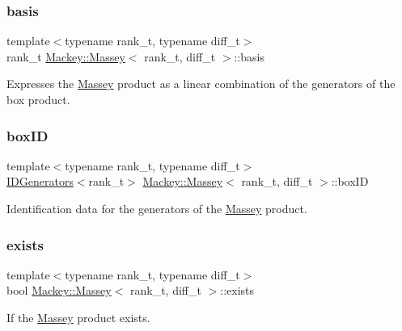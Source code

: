\subsubsection{\texorpdfstring{basis}{basis}}
{\footnotesize\ttfamily template$<$typename rank\+\_\+t, typename diff\+\_\+t$>$ \\
rank\+\_\+t \hyperlink{classMackey_1_1Massey}{Mackey\+::\+Massey}$<$ rank\+\_\+t, diff\+\_\+t $>$\+::basis}



Expresses the \hyperlink{classMackey_1_1Massey}{Massey} product as a linear combination of the generators of the box product. 

\mbox{\label{classMackey_1_1Massey_ae105b04a17ced9c6fd8fef94a9b56aa2}} 
\subsubsection{\texorpdfstring{box\+ID}{boxID}}
{\footnotesize\ttfamily template$<$typename rank\+\_\+t, typename diff\+\_\+t$>$ \\
\hyperlink{classMackey_1_1IDGenerators}{I\+D\+Generators}$<$rank\+\_\+t$>$ \hyperlink{classMackey_1_1Massey}{Mackey\+::\+Massey}$<$ rank\+\_\+t, diff\+\_\+t $>$\+::box\+ID}



Identification data for the generators of the \hyperlink{classMackey_1_1Massey}{Massey} product. 

\mbox{\label{classMackey_1_1Massey_a7890eb54ac6d6c48576ba131a59e551f}} 
\subsubsection{\texorpdfstring{exists}{exists}}
{\footnotesize\ttfamily template$<$typename rank\+\_\+t, typename diff\+\_\+t$>$ \\
bool \hyperlink{classMackey_1_1Massey}{Mackey\+::\+Massey}$<$ rank\+\_\+t, diff\+\_\+t $>$\+::exists}



If the \hyperlink{classMackey_1_1Massey}{Massey} product exists. 

\mbox{\label{classMackey_1_1Massey_a221c49aa23c7d7cb9a3d26db9e6e4a94}} 
